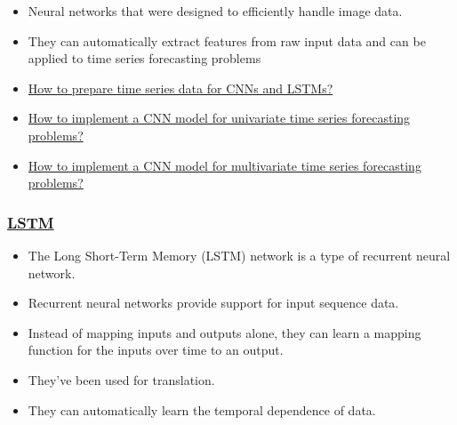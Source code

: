 \documentclass[aspectratio=169,10pt,xcolor={table,dvipsnames},t]{beamer}
\begin{document}
{\begin{frame}
	\begin{itemize}
		\item Neural networks that were designed to efficiently handle image data. 
		\item They can automatically extract features from raw input data and can be applied to time series forecasting problems
		\item \href{https://datahub.berkeley.edu/user-redirect/git-pull?repo=https://github.com/mtsn-lab/me137-237a&subPath=examples/timeSeriesData.ipynb}{How to prepare time series data for CNNs and LSTMs?}
		\item \href{https://datahub.berkeley.edu/user-redirect/git-pull?repo=https://github.com/mtsn-lab/me137-237a&subPath=examples/cnnUnivariate.ipynb}{How to implement a CNN model for univariate time series forecasting problems?}
		\item \href{https://datahub.berkeley.edu/user-redirect/git-pull?repo=https://github.com/mtsn-lab/me137-237a&subPath=examples/cnnMultivariate.ipynb}{How to implement a CNN model for multivariate time series forecasting problems?
}
	\end{itemize}

    \end{frame}
    
    \begin{frame}
        \frametitle{\href{https://datahub.berkeley.edu/user-redirect/git-pull?repo=https://github.com/mtsn-lab/me137-237a&subPath=examples/lstmUnivariate.ipynb}{LSTM} \cite{brownlee2018deep}}

	\begin{itemize}
		\item The Long Short-Term Memory (LSTM) network is a type of recurrent neural network. 
		\item Recurrent neural networks provide support for input sequence data. 
		\item Instead of mapping inputs and outputs alone, they can learn a mapping function for the inputs over time to an output. 
		\item They’ve been used for translation. 
		\item They can automatically learn the temporal dependence of data. 
	\end{itemize}
    \end{frame}

}
\end{document}
